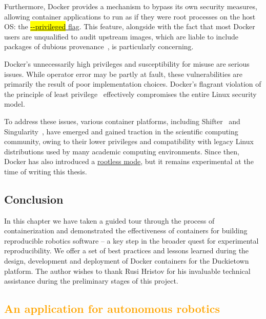 \documentclass[12pt,initial,twoside,maitrise]{dms}
\newcommand{\mediumrare}[1]{\textcolor{orange}{#1}}
\newcommand{\inline}[1]{%
    \begingroup%
    \sethlcolor{slightgray}%
    \hl{\ttfamily\small #1}%
    \endgroup
}
\numberwithin{equation}{section}
\numberwithin{table}{chapter}
\numberwithin{figure}{chapter}
\begin{document}
Furthermore, Docker provides a mechanism to bypass its own security measures, allowing container applications to run as if they were root processes on the host OS: the \href{https://docs.docker.com/engine/reference/run/#security-configuration}{\inline{-{}-privileged} flag}. This feature, alongside with the fact that most Docker users are unqualified to audit upstream images, which are liable to include packages of dubious provenance~\citep{martin2018docker}, is particularly concerning.

Docker's unnecessarily high privileges and susceptibility for misuse are serious issues. While operator error may be partly at fault, these vulnerabilities are primarily the result of poor implementation choices. Docker's flagrant violation of the principle of least privilege~\citep{saltzer1975protection} effectively compromises the entire Linux security model.

To address these issues, various container platforms, including Shifter~\citep{gerhardt2017shifter} and Singularity~\citep{kurtzer2017singularity}, have emerged and gained traction in the scientific computing community, owing to their lower privileges and compatibility with legacy Linux distributions used by many academic computing environments. Since then, Docker has also introduced a \href{https://engineering.docker.com/2019/02/experimenting-with-rootless-docker/}{rootless mode}, but it remains experimental at the time of writing this thesis.

\section{Conclusion}

In this chapter we have taken a guided tour through the process of containerization and demonstrated the effectiveness of containers for building reproducible robotics software -- a key step in the broader quest for experimental reproducibility. We offer a set of best practices and lessons learned during the design, development and deployment of Docker containers for the Duckietown~\citep{paull2017duckietown} platform. The author wishes to thank Rusi Hristov for his invaluable technical assistance during the preliminary stages of this project.

\mediumrare{\chapter{An application for autonomous robotics}\label{ch:case-study}}
\end{document}
